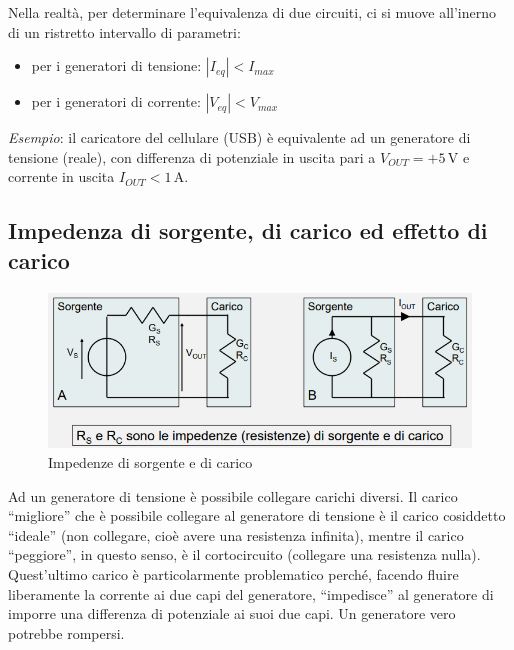 \documentclass{article}
\begin{document}
\vspace{1mm}

Nella realtà, per determinare l'equivalenza di due circuiti, ci si muove all'inerno di un ristretto intervallo di parametri:

\begin{itemize}
  \item per i generatori di tensione: $|I_{eq}|<I_{max}$
  \item per i generatori di corrente: $|V_{eq}|<V_{max}$
\end{itemize}

\textit{Esempio}: il caricatore del cellulare (USB) è equivalente ad un generatore di tensione (reale), con differenza di potenziale in uscita pari a $V_{OUT} = +5\,$V e corrente in uscita $I_{OUT} < 1\,$A.

\clearpage








\subsection{Impedenza di sorgente, di carico ed effetto di carico}

\begin{figure}[h]
  \centering
  \includegraphics[scale=0.6]{IM_impedenze}
  \caption{Impedenze di sorgente e di carico}
  \label{Schema_impedenze}
\end{figure}

Ad un generatore di tensione è possibile collegare carichi diversi. Il carico ``migliore'' che è possibile collegare al generatore di tensione è il carico cosiddetto ``ideale'' (non collegare, cioè avere una resistenza infinita), mentre il carico ``peggiore'', in questo senso, è il cortocircuito (collegare una resistenza nulla). Quest'ultimo carico è particolarmente problematico perché, facendo fluire liberamente la corrente ai due capi del generatore, ``impedisce'' al generatore di imporre una differenza di potenziale ai suoi due capi. Un generatore vero potrebbe rompersi.
\end{document}
